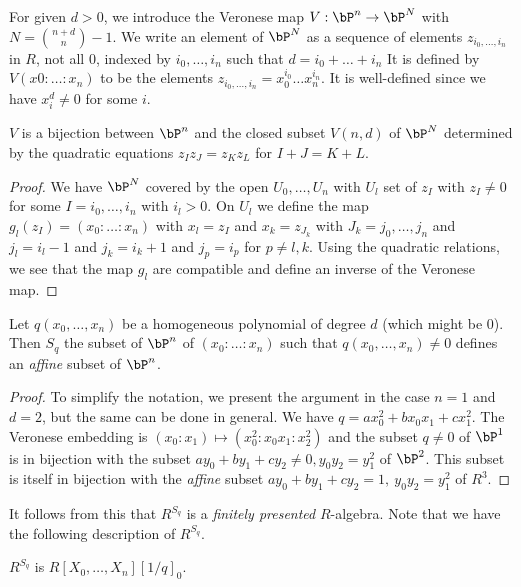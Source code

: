 For given $d>0$, we introduce the Veronese map $V: \bP^n\rightarrow \bP^N$ with $N = \binom{n+d}{n}-1$.
We write an element of $\bP^N$ as a sequence of elements $z_{i_0,\dots,i_n}$ in $R$, not all $0$,
indexed by $i_0,\dots,i_n$ such that $d = i_0+\dots+i_n$
It is defined by $V(x0:\dots:x_n)$ to be the elements $z_{i_0,\dots,i_n} = x_0^{i_0}\dots x_n^{i_n}$. It is well-defined
since we have $x_i^d\neq 0$ for some $i$.

\begin{proposition}\label{veronese}
  $V$ is a bijection between $\bP^n$ and the closed subset $V(n,d)$ of $\bP^N$ determined by the quadratic
  equations $z_Iz_J = z_Kz_L$ for $I+J=K+L$.
\end{proposition}

\begin{proof}
  We have $\bP^N$ covered by the open $U_0,\dots,U_n$ with $U_l$ set of $z_I$ with $z_I\neq 0$
  for some $I = i_0,\dots,i_n$ with $i_l>0$. On $U_l$ we define the map $g_l(z_I) = (x_0:\dots:x_n)$
  with $x_l = z_I$ and $x_k = z_{J_k}$ with $J_k = j_0,\dots,j_n$ and $j_l = i_l-1$ and $j_k = i_k+1$
  and $j_p = i_p$ for $p\neq l,k$. Using the quadratic relations, we see that the map $g_l$
  are compatible and define an inverse of the Veronese map.
\end{proof}

\begin{corollary}\label{affine}
  Let $q(x_0,\dots,x_n)$ be a homogeneous polynomial of degree $d$ (which might be $0$). Then $S_q$ the subset
  of $\bP^n$ of $(x_0:\dots:x_n)$ such that $q(x_0,\dots,x_n)\neq 0$
  defines an {\em affine} subset of $\bP^n$.
\end{corollary}

\begin{proof}
  To simplify the notation, we present the argument in the case $n=1$ and $d=2$, but the same can be done
  in general. We have $q = ax_0^2 + bx_0x_1+cx_1^2$. The Veronese embedding is $(x_0:x_1)\mapsto (x_0^2:x_0x_1:x_2^2)$
  and the subset $q\neq 0$ of $\bP^1$ is in bijection with the subset $ay_0+by_1+cy_2\neq 0, y_0y_2 = y_1^2$ of $\bP^2$.
  This subset is itself in bijection with the {\em affine} subset $ay_0+by_1+cy_2 = 1, ~y_0y_2=y_1^2$ of $R^3$.
\end{proof}

It follows from this that $R^{S_q}$ is a {\em finitely presented} $R$-algebra. Note that we have the following description
of $R^{S_q}$.

 \begin{lemma}
   $R^{S_q}$ is  $R[X_0,\dots,X_n][1/q]_0$.
\end{lemma}

